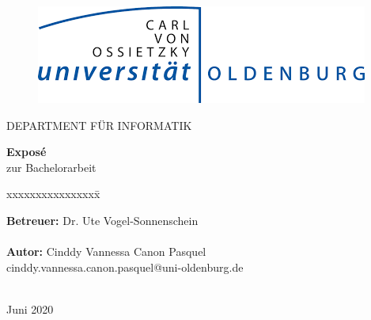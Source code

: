 \documentclass[11pt]{scrartcl}
\begin{document}
\begin{titlepage}
 	\begin{centering}
	\begin{figure}[h!]
    \centering
    \includegraphics[width=310pt]{pics/uol}    %
	\end{figure}
	\large DEPARTMENT FÜR INFORMATIK\\

  	\vspace*{2cm}
  
	\LARGE \textbf{Exposé\\}
	\vspace*{0.2cm}
  	\Large zur Bachelorarbeit\\
  	\vspace*{1cm}  
  


  \end{centering}
  
  \vspace*{3cm}
  \begin{tabbing}
  xxxxxxxxxxxxxxxx\= \kill
  
  \small \textbf{Betreuer: }\> Dr. Ute Vogel-Sonnenschein\\\\

  \small \textbf{Autor: }\>Cinddy Vannessa Canon Pasquel\\
  \small \>cinddy.vannessa.canon.pasquel@uni-oldenburg.de\\\\
  \end{tabbing}
  \vspace*{1cm}
  \normalsize \centering Juni 2020
\end{titlepage}
\end{document}

